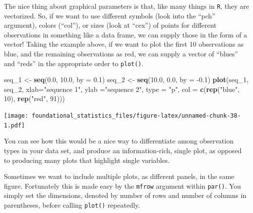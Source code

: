 \documentclass[]{book}
\newenvironment{Shaded}{\begin{snugshade}}{\end{snugshade}}
\newcommand{\DataTypeTok}[1]{\textcolor[rgb]{0.13,0.29,0.53}{#1}}
\newcommand{\DecValTok}[1]{\textcolor[rgb]{0.00,0.00,0.81}{#1}}
\newcommand{\FloatTok}[1]{\textcolor[rgb]{0.00,0.00,0.81}{#1}}
\newcommand{\KeywordTok}[1]{\textcolor[rgb]{0.13,0.29,0.53}{\textbf{#1}}}
\newcommand{\NormalTok}[1]{#1}
\newcommand{\StringTok}[1]{\textcolor[rgb]{0.31,0.60,0.02}{#1}}
\begin{document}
The nice thing about graphical parameters is that, like many things in \texttt{R}, they are vectorized. So, if we want to use different symbols (look into the ``pch'' argument), colors (``col''), or sizes (look at ``cex'') of points for different observations in something like a data frame, we can supply those in the form of a vector! Taking the example above, if we want to plot the first 10 observations as blue, and the remaining observations as red, we can supply a vector of ``blues'' and ``reds'' in the appropriate order to \texttt{plot()}.

\begin{Shaded}
\begin{Highlighting}[]
\NormalTok{seq_}\DecValTok{1}\NormalTok{ <-}\StringTok{ }\KeywordTok{seq}\NormalTok{(}\FloatTok{0.0}\NormalTok{, }\FloatTok{10.0}\NormalTok{, }\DataTypeTok{by =} \FloatTok{0.1}\NormalTok{)}
\NormalTok{seq_}\DecValTok{2}\NormalTok{ <-}\StringTok{ }\KeywordTok{seq}\NormalTok{(}\FloatTok{10.0}\NormalTok{, }\FloatTok{0.0}\NormalTok{, }\DataTypeTok{by =} \FloatTok{-0.1}\NormalTok{)}
\KeywordTok{plot}\NormalTok{(seq_}\DecValTok{1}\NormalTok{, seq_}\DecValTok{2}\NormalTok{, }\DataTypeTok{xlab=}\StringTok{"sequence 1"}\NormalTok{, }\DataTypeTok{ylab =}\StringTok{"sequence 2"}\NormalTok{, }\DataTypeTok{type =} \StringTok{"p"}\NormalTok{, }
     \DataTypeTok{col =} \KeywordTok{c}\NormalTok{(}\KeywordTok{rep}\NormalTok{(}\StringTok{"blue"}\NormalTok{, }\DecValTok{10}\NormalTok{), }\KeywordTok{rep}\NormalTok{(}\StringTok{"red"}\NormalTok{, }\DecValTok{91}\NormalTok{)))}
\end{Highlighting}
\end{Shaded}

\texttt{[image: foundational\_statistics\_files/figure-latex/unnamed-chunk-38-1.pdf]}

You can see how this would be a nice way to differentiate among observation types in your data set, and produce an information-rich, single plot, as opposed to producing many plots that highlight single variables.

Sometimes we want to include multiple plots, as different panels, in the same figure. Fortunately this is made easy by the \texttt{mfrow} argument within \texttt{par()}. You simply set the dimensions, denoted by number of rows and number of columns in parentheses, before calling \texttt{plot()} repeatedly.
\end{document}
